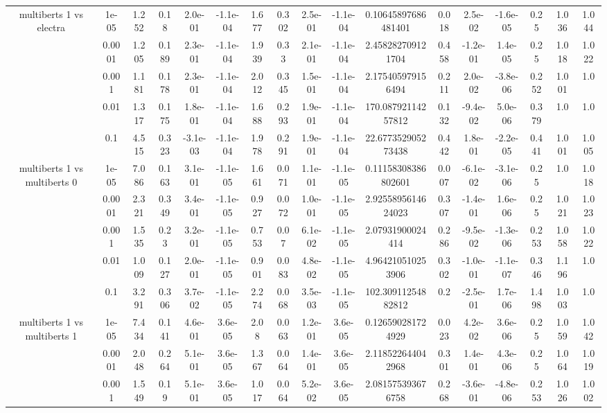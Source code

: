 \begin{tabular}{|c|c|c|c|c|c|c|c|c|c|c|c|c|c|c|c|c|}
\hline
\multirow{5}{*}{multiberts 1 vs electra } & 1e-05 & 1.252 & 0.18 & 2.0e-01 & -1.1e-04 & 1.677 & 0.302 & 2.5e-01 & -1.1e-04 & 0.10645897686481401 & 0.018 & 2.5e-02 & -1.6e-05 & 0.25 & 1.036 & 1.044 \\
 & 0.0001 & 1.205 & 0.189 & 2.3e-01 & -1.1e-04 & 1.939 & 0.33 & 2.1e-01 & -1.1e-04 & 2.458282709121704 & 0.458 & -1.2e-01 & 1.4e-05 & 0.25 & 1.018 & 1.022 \\
 & 0.001 & 1.181 & 0.178 & 2.3e-01 & -1.1e-04 & 2.012 & 0.345 & 1.5e-01 & -1.1e-04 & 2.175405979156494 & 0.211 & 2.0e-02 & -3.8e-06 & 0.252 & 1.001 & 1.0 \\
 & 0.01 & 1.317 & 0.175 & 1.8e-01 & -1.1e-04 & 1.688 & 0.293 & 1.9e-01 & -1.1e-04 & 170.08792114257812 & 0.132 & -9.4e-02 & 5.0e-06 & 0.379 & 1.0 & 1.0 \\
 & 0.1 & 4.515 & 0.323 & -3.1e-03 & -1.1e-04 & 1.978 & 0.291 & 1.9e-01 & -1.1e-04 & 22.677352905273438 & 0.442 & 1.8e-01 & -2.2e-05 & 0.441 & 1.001 & 1.005 \\
\hline
\multirow{5}{*}{multiberts 1 vs multiberts 0} & 1e-05 & 7.086 & 0.163 & 3.1e-01 & -1.1e-05 & 1.661 & 0.071 & 1.1e-01 & -1.1e-05 & 0.11158308386802601 & 0.007 & -6.1e-02 & -3.1e-06 & 0.25 & 1.0 & 1.018 \\
 & 0.0001 & 2.321 & 0.349 & 3.4e-01 & -1.1e-05 & 0.927 & 0.072 & 1.0e-01 & -1.1e-05 & 2.9255895614624023 & 0.307 & -1.4e-01 & 1.6e-06 & 0.25 & 1.021 & 1.023 \\
 & 0.001 & 1.535 & 0.23 & 3.2e-01 & -1.1e-05 & 0.753 & 0.07 & 6.1e-02 & -1.1e-05 & 2.07931900024414 & 0.286 & -9.5e-02 & -1.3e-06 & 0.253 & 1.058 & 1.022 \\
 & 0.01 & 1.009 & 0.127 & 2.0e-01 & -1.1e-05 & 0.901 & 0.083 & 4.8e-02 & -1.1e-05 & 4.964210510253906 & 0.302 & -1.0e-01 & -1.1e-07 & 0.346 & 1.196 & 1.0 \\
 & 0.1 & 3.291 & 0.306 & 3.7e-02 & -1.1e-05 & 2.274 & 0.068 & 3.5e-03 & -1.1e-05 & 102.30911254882812 & 0.2 & -2.5e-01 & 1.7e-06 & 1.498 & 1.003 & 1.0 \\
\hline
\multirow{5}{*}{multiberts 1 vs multiberts 1} & 1e-05 & 7.434 & 0.141 & 4.6e-01 & 3.6e-05 & 2.08 & 0.063 & 1.2e-01 & 3.6e-05 & 0.126590281724929 & 0.023 & 4.2e-02 & 3.6e-06 & 0.25 & 1.059 & 1.042 \\
 & 0.0001 & 2.048 & 0.264 & 5.1e-01 & 3.6e-05 & 1.367 & 0.064 & 1.4e-01 & 3.6e-05 & 2.118522644042968 & 0.301 & 1.4e-01 & 4.3e-06 & 0.25 & 1.064 & 1.019 \\
 & 0.001 & 1.549 & 0.19 & 5.1e-01 & 3.6e-05 & 1.017 & 0.064 & 5.2e-02 & 3.6e-05 & 2.081575393676758 & 0.268 & -3.6e-01 & -4.8e-06 & 0.253 & 1.026 & 1.002 \\

\end{tabular}
